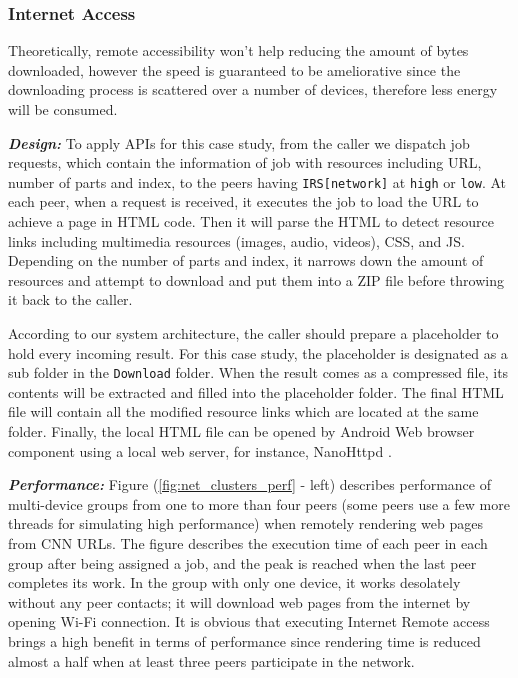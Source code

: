 \documentclass{sig-alternate}
\begin{document}
\subsubsection{Internet Access} 
Theoretically, remote accessibility won't help reducing the amount of bytes downloaded, however the speed is guaranteed to be ameliorative since the downloading process is scattered over a number of devices, therefore less energy will be consumed. 

\textbf{\emph{Design:}}
To apply APIs for this case study, from the caller we dispatch job requests, which contain the information of job with resources including URL, number of parts and index, to the peers having \texttt{IRS[network]} at \texttt{high} or \texttt{low}. At each peer, when a request is received, it executes the job to load the URL to achieve a page in HTML code. Then it will parse the HTML to detect resource links including multimedia resources (images, audio, videos), CSS, and JS. Depending on the number of parts and index, it narrows down the amount of resources and attempt to download and put them into a ZIP file before throwing it back to the caller.

According to our system architecture, the caller should prepare a placeholder to hold every incoming result. For this case study, the placeholder is designated as a sub folder in the \texttt{Download} folder. When the result comes as a compressed file, its contents will be extracted and filled into the placeholder folder. The final HTML file will contain all the modified resource links which are located at the same folder. Finally, the local HTML file can be opened by Android Web browser component using a local web server, for instance, NanoHttpd \cite{nanohttpd}.

\textbf{\emph{Performance:}}
Figure (\ref{fig:net_clusters_perf} - left) describes performance of multi-device groups from one to more than four peers (some peers use a few more threads for simulating high performance) when remotely rendering web pages from CNN URLs. The figure describes the execution time of each peer in each group after being assigned a job, and the peak is reached when the last peer completes its work. In the group with only one device, it works desolately without any peer contacts; it will download web pages from the internet by opening Wi-Fi connection. It is obvious that executing Internet Remote access brings a high benefit in terms of performance since rendering time is reduced almost a half when at least three peers participate in the network. 
\end{document}
